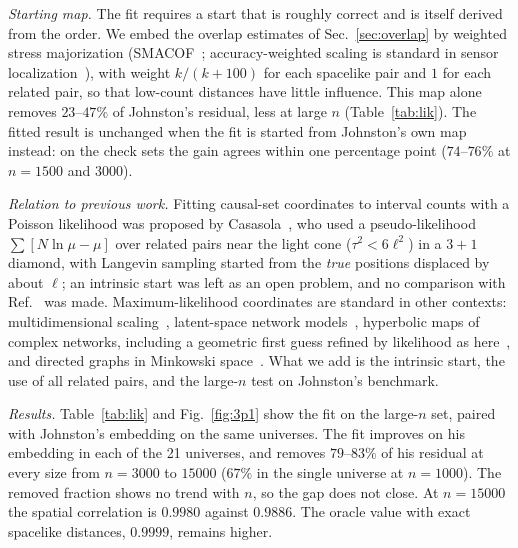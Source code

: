 \documentclass[prd,twocolumn,superscriptaddress,nofootinbib,amsmath,amssymb,floatfix]{revtex4-2}
\begin{document}
\emph{Starting map.} The fit requires a start that is roughly correct and is itself derived from the order. We embed the overlap estimates of Sec.~\ref{sec:overlap} by weighted stress majorization (SMACOF~\cite{deLeeuwMair09}; accuracy-weighted scaling is standard in sensor localization~\cite{CostaPatwariHero06}), with weight $k/(k+100)$ for each spacelike pair and $1$ for each related pair, so that low-count distances have little influence. This map alone removes $23$--$47\%$ of Johnston's residual, less at large $n$ (Table~\ref{tab:lik}). The fitted result is unchanged when the fit is started from Johnston's own map instead: on the check sets the gain agrees within one percentage point ($74$--$76\%$ at $n=1500$ and $3000$).

\emph{Relation to previous work.} Fitting causal-set coordinates to interval counts with a Poisson likelihood was proposed by Casasola~\cite{Casasola26}, who used a pseudo-likelihood $\sum[N\ln\mu-\mu]$ over related pairs near the light cone ($\tau^2<6\ell^2$) in a $3+1$ diamond, with Langevin sampling started from the \emph{true} positions displaced by about $\ell$; an intrinsic start was left as an open problem, and no comparison with Ref.~\cite{Johnston25} was made. Maximum-likelihood coordinates are standard in other contexts: multidimensional scaling~\cite{Ramsay77}, latent-space network models~\cite{Hoff02}, hyperbolic maps of complex networks, including a geometric first guess refined by likelihood as here~\cite{BPK10,Mercator19}, and directed graphs in Minkowski space~\cite{Sim21}. What we add is the intrinsic start, the use of all related pairs, and the large-$n$ test on Johnston's benchmark.

\emph{Results.} Table~\ref{tab:lik} and Fig.~\ref{fig:3p1} show the fit on the large-$n$ set, paired with Johnston's embedding on the same universes. The fit improves on his embedding in each of the 21 universes, and removes $79$--$83\%$ of his residual at every size from $n=3000$ to $15000$ ($67\%$ in the single universe at $n=1000$). The removed fraction shows no trend with $n$, so the gap does not close. At $n=15000$ the spatial correlation is $0.9980$ against $0.9886$. The oracle value with exact spacelike distances, $0.9999$, remains higher.
\end{document}
